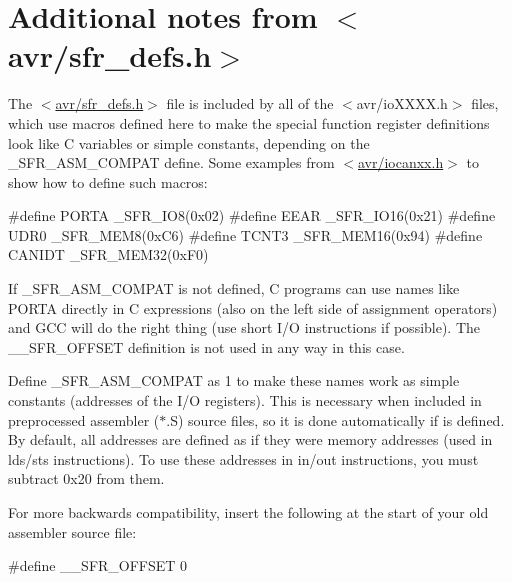 \hypertarget{group__avr__sfr__notes}{}\section{Additional notes from $<$avr/sfr\+\_\+defs.h$>$}
\label{group__avr__sfr__notes}
The {\ttfamily $<$\hyperlink{sfr__defs_8h_source}{avr/sfr\+\_\+defs.\+h}$>$} file is included by all of the {\ttfamily $<$avr/io\+X\+X\+X\+X.\+h$>$} files, which use macros defined here to make the special function register definitions look like C variables or simple constants, depending on the {\ttfamily \+\_\+\+S\+F\+R\+\_\+\+A\+S\+M\+\_\+\+C\+O\+M\+P\+AT} define. Some examples from {\ttfamily $<$\hyperlink{iocanxx_8h_source}{avr/iocanxx.\+h}$>$} to show how to define such macros\+:


\begin{DoxyCode}
\textcolor{preprocessor}{#define PORTA   \_SFR\_IO8(0x02)}
\textcolor{preprocessor}{#define EEAR    \_SFR\_IO16(0x21)}
\textcolor{preprocessor}{#define UDR0    \_SFR\_MEM8(0xC6)}
\textcolor{preprocessor}{#define TCNT3   \_SFR\_MEM16(0x94)}
\textcolor{preprocessor}{#define CANIDT  \_SFR\_MEM32(0xF0)}
\end{DoxyCode}


If {\ttfamily \+\_\+\+S\+F\+R\+\_\+\+A\+S\+M\+\_\+\+C\+O\+M\+P\+AT} is not defined, C programs can use names like {\ttfamily P\+O\+R\+TA} directly in C expressions (also on the left side of assignment operators) and G\+CC will do the right thing (use short I/O instructions if possible). The {\ttfamily \+\_\+\+\_\+\+S\+F\+R\+\_\+\+O\+F\+F\+S\+ET} definition is not used in any way in this case.

Define {\ttfamily \+\_\+\+S\+F\+R\+\_\+\+A\+S\+M\+\_\+\+C\+O\+M\+P\+AT} as 1 to make these names work as simple constants (addresses of the I/O registers). This is necessary when included in preprocessed assembler ($\ast$.S) source files, so it is done automatically if {} is defined. By default, all addresses are defined as if they were memory addresses (used in {\ttfamily lds/sts} instructions). To use these addresses in {\ttfamily in/out} instructions, you must subtract 0x20 from them.

For more backwards compatibility, insert the following at the start of your old assembler source file\+:


\begin{DoxyCode}
\textcolor{preprocessor}{#define \_\_SFR\_OFFSET 0}
\end{DoxyCode}


